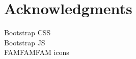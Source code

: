 \cleardoublepage
{}
{}
\chapter*{Acknowledgments}
\vspace{1.0in}
Bootstrap CSS\\
Bootstrap JS\\
FAMFAMFAM icons\\
\newpage
